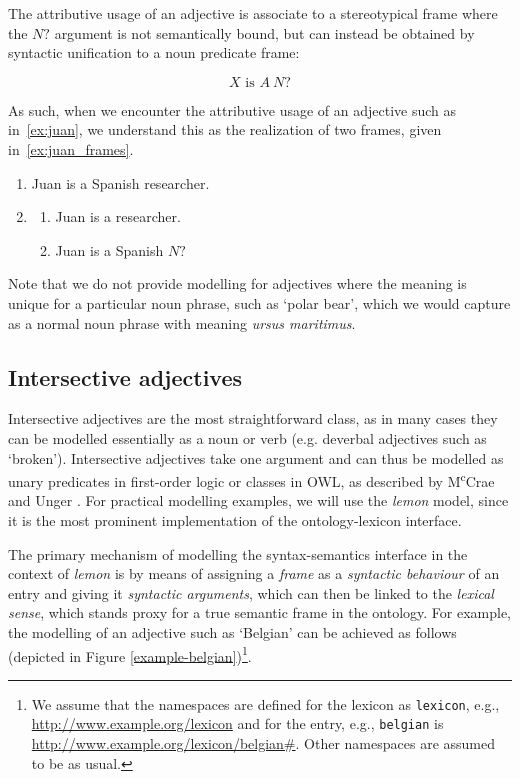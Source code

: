\documentclass[11pt]{article}
\begin{document}
The attributive usage of an adjective is associate to a stereotypical frame where the $N?$ argument is not semantically bound, but can instead be obtained by syntactic unification to a noun predicate frame:


\vspace{-1.0em}
$$X\text{ is }A~N?$$
\vspace{-1.5em}

As such, when we encounter the attributive usage of an adjective such as in~\ref{ex:juan}, 
we understand this as the realization of two frames, given in~\ref{ex:juan_frames}.

\begin{enumerate}
\item Juan is a Spanish researcher. \label{ex:juan}
\item \begin{enumerate}
\item Juan is a researcher.
\item Juan is a Spanish $N?$
\end{enumerate}
\label{ex:juan_frames}
\end{enumerate}

Note that we do not provide modelling for adjectives where the meaning is unique for a particular noun phrase,
such as `polar bear', which we would capture as a normal noun phrase with 
meaning \emph{ursus maritimus}.

\subsection{Intersective adjectives} \label{sec:intersectives}

Intersective adjectives are the most straightforward class, as in many cases they 
can be modelled essentially as a noun or verb (e.g. deverbal adjectives such as `broken'). Intersective 
adjectives take one argument and can thus be modelled as unary predicates in first-order logic or classes in OWL, as described by M\textsuperscript{c}Crae and Unger . For practical modelling examples, we will use the
\emph{lemon} model, since it is the most prominent implementation of the 
ontology-lexicon interface.

The primary mechanism of modelling the syntax-semantics interface in the context 
of \emph{lemon} is by means of assigning a \emph{frame} as a \emph{syntactic 
behaviour} of an entry and giving it \emph{syntactic arguments}, which can then 
be linked to the \emph{lexical sense}, which stands proxy for a true semantic 
frame in the ontology. For example, the modelling of an adjective such as 
`Belgian' can be achieved as follows (depicted in Figure 
\ref{example-belgian})\footnote{We assume that the namespaces are defined for 
the lexicon as {\tt lexicon}, e.g., \url{http://www.example.org/lexicon}
and for the entry, e.g., {\tt belgian} is \url{http://www.example.org/lexicon/belgian#}.
Other namespaces are assumed to be as usual.}.
\end{document}
